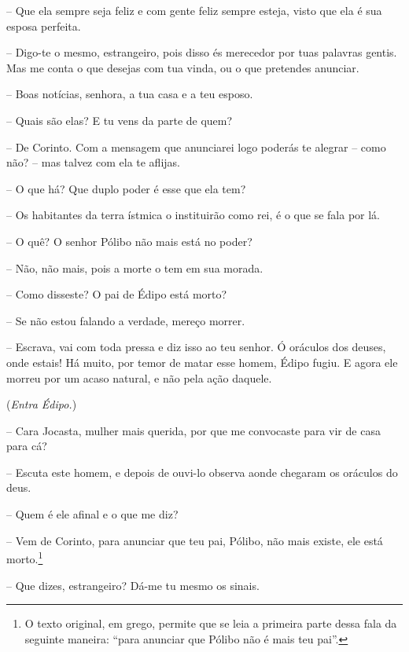  --    Que ela sempre seja feliz e com gente feliz sempre esteja, visto
que ela é sua esposa perfeita.

 --   Digo-te o mesmo, estrangeiro, pois disso és merecedor por tuas palavras
gentis. Mas me conta o que desejas com tua vinda, ou o que pretendes
anunciar.

 --   Boas notícias, senhora, a tua casa e a teu esposo.

 --   Quais são elas? E tu vens da parte de quem?

 --   De Corinto. Com a mensagem que anunciarei logo poderás te alegrar --
como não? -- mas talvez com ela te aflijas.

 --   O que há? Que duplo poder é esse que ela tem?

 --    Os habitantes da terra ístmica o instituirão como rei, é o que se
fala por lá.

 --   O quê? O senhor Pólibo não mais está no poder?

 --   Não, não mais, pois a morte o tem em sua morada.

 --   Como disseste? O pai de Édipo está morto?

 --   Se não estou falando a verdade, mereço morrer.

 --   Escrava, vai com toda pressa e diz isso ao teu senhor. Ó oráculos dos
deuses, onde estais! Há muito, por temor de matar esse homem, Édipo
fugiu. E agora ele morreu por um acaso natural, e não pela ação daquele.

(\emph{Entra Édipo.})

 --    Cara Jocasta, mulher mais querida, por que me convocaste para vir
de casa para cá?

 --   Escuta este homem, e depois de ouvi-lo observa aonde chegaram os
oráculos do deus.

 --   Quem é ele afinal e o que me diz?

 --   Vem de Corinto, para anunciar que teu pai, Pólibo, não mais existe, ele
está morto.\footnote{O texto original, em grego, permite que se leia a
  primeira parte dessa fala da seguinte maneira: ``para anunciar
  que Pólibo não é mais teu pai''.}

 --   Que dizes, estrangeiro? Dá-me tu mesmo os sinais.

